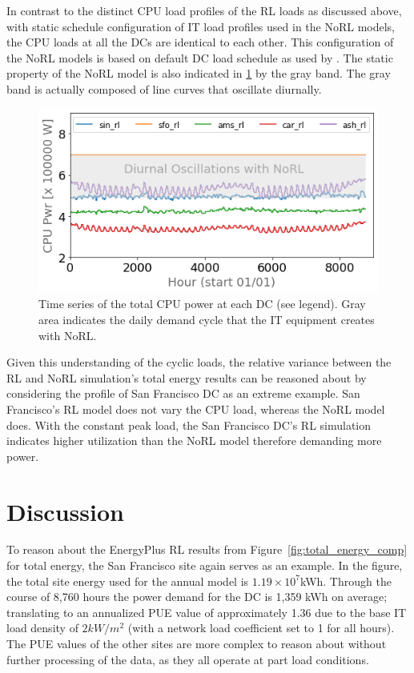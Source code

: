 In contrast to the distinct CPU load profiles of the RL loads as discussed above, with static schedule configuration of IT load profiles used in the NoRL models, the CPU loads at all the DCs are identical to each other. This configuration of the NoRL models is based on default DC load schedule as used by \citep{moriyama18}. The static property of the NoRL model is also indicated in \ref{fig:cpu_comps} by the gray band. The gray band is actually composed of line curves that oscillate diurnally.


\begin{figure}
  \centering
  \includegraphics[scale=0.45]{img/cpu_comps.png}
  \caption{Time series of the total CPU power at each DC (see legend). Gray area indicates the daily demand cycle that the IT equipment creates with NoRL.}
  \label{fig:cpu_comps}
  \end{figure}

  Given this understanding of the cyclic loads, the relative variance between the RL and NoRL simulation’s total energy results can be reasoned about by considering the profile of San Francisco DC as an extreme example. San Francisco’s RL model does not vary the CPU load, whereas the NoRL model does. With the constant peak load, the San Francisco DC’s RL simulation indicates higher utilization than the NoRL model therefore demanding more power.


\section{Discussion}
To reason about the EnergyPlus RL results from Figure~\ref{fig:total_energy_comp} for total energy, the San Francisco site again serves as an example. In the figure, the total site energy used for the annual model is $1.19 \times 10^7$kWh. Through the course of 8,760 hours the power demand for the DC is 1,359 kWh on average; translating to an annualized PUE value of approximately 1.36 due to the base IT load density of $2 kW/m^2$ (with a network load coefficient set to 1 for all hours). The PUE values of the other sites are more complex to reason about without further processing of the data, as they all operate at part load conditions.

